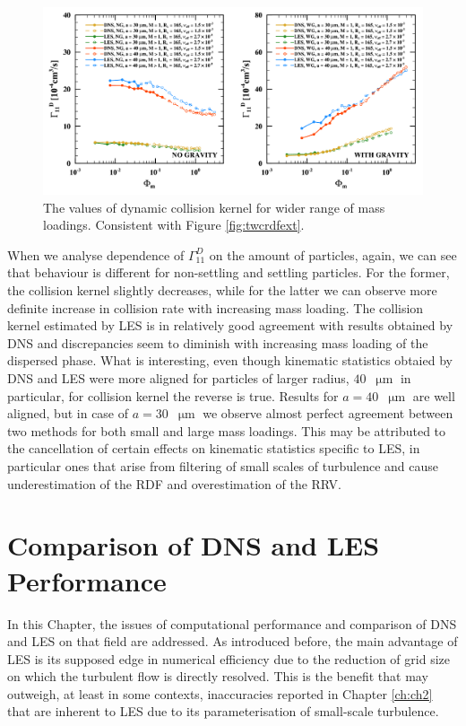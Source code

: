 \documentclass{pracamgren}
\begin{document}
\begin{figure}[ht]
\centering
\includegraphics[width=13.5cm]{figures/2-13_twcgammaext.pdf}
\caption{
The values of dynamic collision kernel for wider range of mass loadings.
Consistent with Figure \ref{fig:twcrdfext}.
}
\label{fig:twcgammaext}
\end{figure}

When we analyse dependence of $\Gamma^D_{11}$ on the amount of particles, again, we can see that behaviour is different for non-settling and settling particles.
For the former, the collision kernel slightly decreases, while for the latter we can observe more definite increase in collision rate with increasing mass loading.
The collision kernel estimated by LES is in relatively good agreement with results obtained by DNS and discrepancies seem to diminish with increasing mass loading of the dispersed phase.
What is interesting, even though kinematic statistics obtaied by DNS and LES were more aligned for particles of larger radius, $40$~$\upmu\text{m}$ in particular, for collision kernel the reverse is true.
Results for $a = 40$~$\upmu\text{m}$ are well aligned, but in case of $a = 30$~$\upmu\text{m}$ we observe almost perfect agreement between two methods for both small and large mass loadings.
This may be attributed to the cancellation of certain effects on kinematic statistics specific to LES, in particular ones that arise from filtering of small scales of turbulence and cause underestimation of the RDF and overestimation of the RRV.



\chapter{Comparison of DNS and LES Performance}
\label{ch:ch3}

In this Chapter, the issues of computational performance and comparison of DNS and LES on that field are addressed.
As introduced before, the main advantage of LES is its supposed edge in numerical efficiency due to the reduction of grid size on which the turbulent flow is directly resolved.
This is the benefit that may outweigh, at least in some contexts, inaccuracies reported in Chapter \ref{ch:ch2} that are inherent to LES due to its parameterisation of small-scale turbulence.
\end{document}

